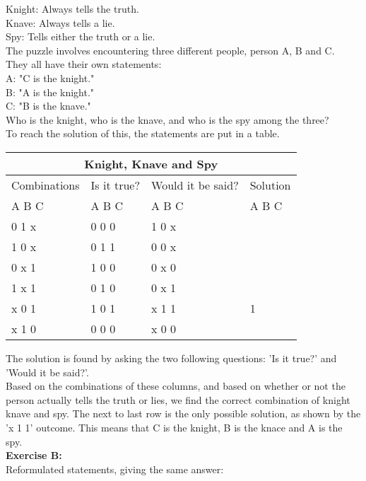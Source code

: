 \documentclass[11pt]{amsart}
\begin{document}
Knight: Always tells the truth.\\
Knave: 	Always tells a lie.\\
Spy: 		Tells either the truth or a lie. \\

The puzzle involves encountering three different people, person A, B and C. \\

They all have their own statements: \\

	A: "C is the knight."\\
	B: "A is the knight."\\
	C: "B is the knave." \\

Who is the knight, who is the knave, and who is the spy among the three? \\

To reach the solution of this, the statements are put in a table. \\
\begin{tabular}{ |p{3cm}||p{3cm}|p{3cm}|p{3cm}|  }
 \hline
 \multicolumn{4}{|c|}{Knight, Knave and Spy} \\
 \hline
 Combinations & Is it true? & Would it be said? & Solution  \\ A  B  C   &   A  B  C  &   A  B  C & A  B  C \\
 \hline
	0   1   x  	& 0	0	0   & 1 0 x &  \\
	1   0   x		& 0	1	1  	& 0 0 x &  \\
	0   x   1 	&	1	0	0 	& 0 x 0 &  \\
	1   x   1  	&	0	1	0 	& 0 x 1 &  \\
	x   0   1		& 1	0	1  	& x 1 1 & 1\\
	x   1   0		& 0	0	0  	& x 0 0 &  \\
 \hline
\end{tabular}

The solution is found by asking the two following questions: 'Is it true?' and 'Would it be said?'. \\

Based on the combinations of these columns, and based on whether or not the person actually tells the truth or lies,
we find the correct combination of knight knave and spy. The next to last row is the only possible solution,
as shown by the 'x 1 1' outcome. This means that C is the knight, B is the knace and A is the spy. \\


\textbf{Exercise B:} \\
Reformulated statements, giving the same answer:\\
\end{document}
